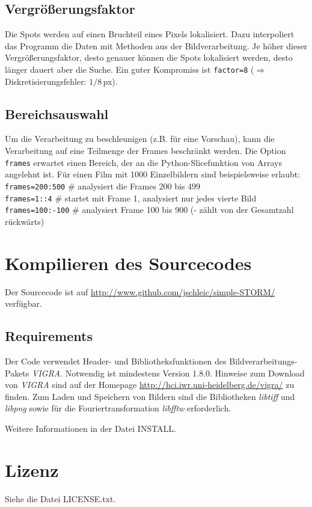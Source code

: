 \documentclass[DIV15,a4paper]{scrartcl}
\begin{document}
\subsection{Vergrößerungsfaktor}
Die Spots werden auf einen Bruchteil eines Pixels lokalisiert. Dazu interpoliert 
das Programm die Daten mit Methoden aus der Bildverarbeitung. Je höher dieser 
Vergrößerungsfaktor, desto genauer können die Spots lokalisiert werden, desto 
länger dauert aber die Suche. Ein guter Kompromiss ist \texttt{factor=8} 
($\Rightarrow$ Diskretisierungsfehler: $1/8$\,px).

\subsection{Bereichsauswahl}
Um die Verarbeitung zu beschleunigen (z.B. für eine Vorschau), kann die Verarbeitung auf 
eine Teilmenge der Frames beschränkt werden. Die Option \texttt{frames} erwartet
einen Bereich, der an die Python-Slicefunktion von Arrays angelehnt ist. 
Für einen Film mit 1000 Einzelbildern sind beispielsweise erlaubt:\\
\texttt{frames=200:500} \# analysiert die Frames 200 bis 499\\
\texttt{frames=1::4} \# startet mit Frame 1, analysiert nur jedes vierte Bild\\
\texttt{frames=100:-100} \# analysiert Frame 100 bis 900 (- zählt von der Gesamtzahl rückwärts) %


\section{Kompilieren des Sourcecodes}
\label{sec:Kompilieren}
Der Sourcecode ist auf \url{http://www.github.com/jschleic/simple-STORM/} verfügbar.
\subsection{Requirements}
Der Code verwendet Header- und Bibliotheksfunktionen des Bildverarbeitungs-Pakets \emph{VIGRA}.
Notwendig ist mindestens Version 1.8.0.
Hinweise zum Download 
von \emph{VIGRA} sind auf der Homepage \url{http://hci.iwr.uni-heidelberg.de/vigra/} zu finden.
Zum Laden und Speichern von Bildern sind die Bibliotheken \emph{libtiff} und \emph{libpng} sowie 
für die Fouriertransformation \emph{libfftw} erforderlich.

Weitere Informationen in der Datei INSTALL.


\section{Lizenz}
Siehe die Datei LICENSE.txt.
\end{document}
